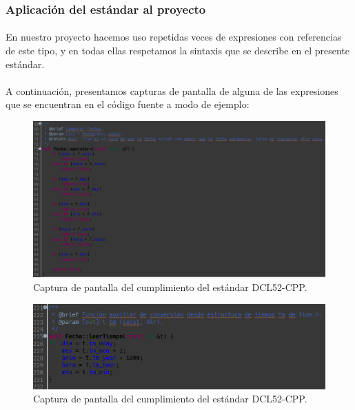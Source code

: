 		\subsubsection{Aplicación del estándar al proyecto}
		
			\paragraph{}En nuestro proyecto hacemos uso repetidas veces de expresiones con referencias de este tipo, y en todas ellas respetamos la sintaxis que se describe en el presente estándar.
			
			\paragraph{}A continuación, presentamos capturas de pantalla de alguna de las expresiones que se encuentran en el código fuente a modo de ejemplo:
			
			\begin{figure}[H]
				\centering
				\includegraphics[scale=0.45]{img/captura38.png}
				\caption{Captura de pantalla del cumplimiento del estándar DCL52-CPP.}
				\label{captura38}
			\end{figure}
		
			\begin{figure}[H]
				\centering
				\includegraphics[scale=0.6]{img/captura39.png}
				\caption{Captura de pantalla del cumplimiento del estándar DCL52-CPP.}
				\label{captura39}
			\end{figure}

